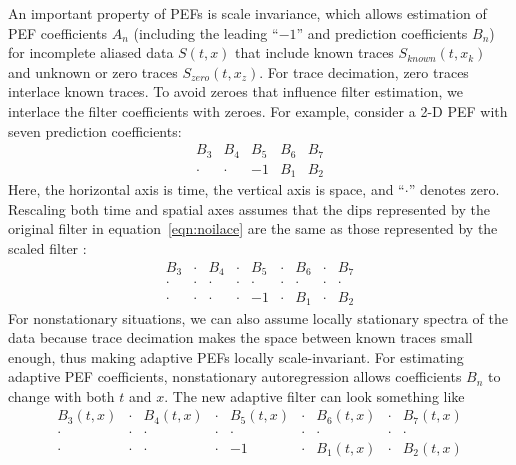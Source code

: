 An important property of PEFs is scale invariance, which allows
estimation of PEF coefficients $A_n$ (including the leading ``$-1$''
and prediction coefficients $B_n$) for incomplete aliased data
$S(t,x)$ that include known traces
$S_{known}(t,x_k)$ and unknown or zero traces
$S_{zero}(t,x_z)$. For trace decimation, zero 
traces interlace known traces. To avoid zeroes that influence filter
estimation, we interlace the filter coefficients with zeroes. For
example, consider a 2-D PEF with seven prediction coefficients:
\begin{equation}
   \begin{array}{ccccc}
      B_3    &B_4    &B_5     &B_6     &B_7     \\
      \cdot  &\cdot  &-1      &B_1     &B_2 \end{array}
\label{eqn:noilace}
\end{equation}
Here, the horizontal axis is time, the vertical axis is space, and
``$\cdot$'' denotes zero. Rescaling both time and spatial axes assumes
that the dips represented by the original filter in
equation~\ref{eqn:noilace} are the same as those represented by the
scaled filter
\cite[]{Claerbout92}:
\begin{equation}
   \begin{array}{ccccccccc} 
   B_3 &\cdot &B_4 &\cdot &B_5 &\cdot &B_6 &\cdot &B_7 \\
   \cdot &\cdot &\cdot &\cdot &\cdot &\cdot &\cdot &\cdot &\cdot \\
   \cdot &\cdot &\cdot &\cdot &-1 &\cdot &B_1 &\cdot &B_2
   \end{array}
\label{eqn:ilacefil}
\end{equation}
For nonstationary situations, we can also assume locally stationary
spectra of the data because trace decimation makes the space between
known traces small enough, thus making adaptive PEFs locally
scale-invariant. For estimating adaptive PEF coefficients,
nonstationary autoregression allows coefficients $B_n$ to change with
both $t$ and $x$. The new adaptive filter can look something like
\begin{equation}
   \begin{array}{ccccccccc} 
     B_3(t,x) &\cdot &B_4(t,x) &\cdot &B_5(t,x) 
                &\cdot &B_6(t,x) &\cdot &B_7(t,x)
   \\ \cdot &\cdot &\cdot &\cdot &\cdot &\cdot &\cdot &\cdot &\cdot \\
   \cdot &\cdot &\cdot &\cdot &-1 &\cdot &B_1(t,x) &\cdot &B_2(t,x)
   \end{array}
\label{eqn:ailacefil}
\end{equation}
